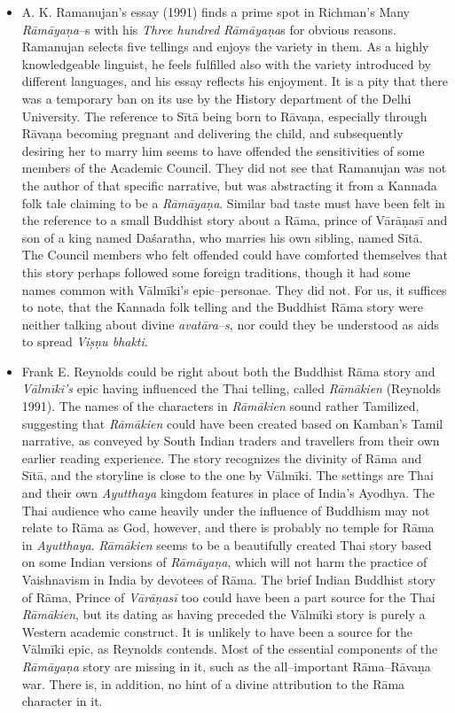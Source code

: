 \begin{itemize}
 \item A. K. Ramanujan’s essay (1991) finds a prime spot in Richman’s Many \textit{Rāmāyaṇa}–s with his \textit{Three hundred} \textit{Rāmāyaṇa}s for obvious reasons. Ramanujan selects five tellings and enjoys the variety in them. As a highly knowledgeable linguist, he feels fulfilled also with the variety introduced by different languages, and his essay reflects his enjoyment. It is a pity that there was a temporary ban on its use by the History department of the Delhi University. The reference to Sītā being born to Rāvaṇa, especially through Rāvaṇa becoming pregnant and delivering the child, and subsequently desiring her to marry him seems to have offended the sensitivities of some members of the Academic Council. They did not see that Ramanujan was not the author of that specific narrative, but was abstracting it from a Kannada folk tale claiming to be a \textit{Rāmāyaṇa}. Similar bad taste must have been felt in the reference to a small Buddhist story about a Rāma, prince of Vārāṇasī and son of a king named Daśaratha, who marries his own sibling, named Sītā. The Council members who felt offended could have comforted themselves that this story perhaps followed some foreign traditions, though it had some names common with Vālmīki’s epic–personae. They did not. For us, it suffices to note, that the Kannada folk telling and the Buddhist Rāma story were neither talking about divine \textit{avatāra–s}, nor could they be understood as aids to spread \textit{Viṣṇu bhakti}.

 \item Frank E. Reynolds could be right about both the Buddhist Rāma story and \textit{Vālmīki’s} epic having influenced the Thai telling, called \textit{Rāmākien} (Reynolds 1991). The names of the characters in \textit{Rāmākien} sound rather Tamilized, suggesting that \textit{Rāmākien} could have been created based on Kamban’s Tamil narrative, as conveyed by South Indian traders and travellers from their own earlier reading experience. The story recognizes the divinity of Rāma and Sītā, and the storyline is close to the one by Vālmīki. The settings are Thai and their own \textit{Ayutthaya} kingdom features in place of India’s Ayodhya. The Thai audience who came heavily under the influence of Buddhism may not relate to Rāma as God, however, and there is probably no temple for Rāma in \textit{Ayutthaya}. \textit{Rāmākien} seems to be a beautifully created Thai story based on some Indian versions of \textit{Rāmāyaṇa}, which will not harm the practice of Vaishnavism in India by devotees of Rāma. The brief Indian Buddhist story of Rāma, Prince of \textit{Vārāṇasī} too could have been a part source for the Thai \textit{Rāmākien}, but its dating as having preceded the Vālmīki story is purely a Western academic construct. It is unlikely to have been a source for the Vālmīki epic, as Reynolds contends. Most of the essential components of the \textit{Rāmāyaṇa} story are missing in it, such as the all–important Rāma–Rāvaṇa war. There is, in addition, no hint of a divine attribution to the Rāma character in it.


\end{itemize}
